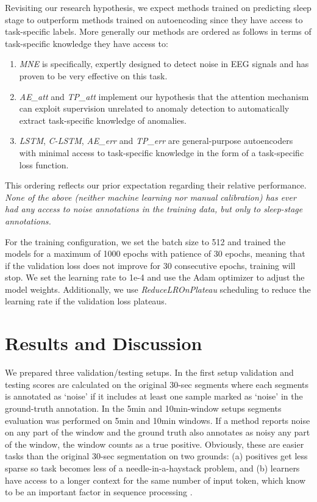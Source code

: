 \documentclass[runningheads]{llncs}
\begin{document}
Revisiting our research hypothesis, we expect methods trained on
predicting sleep stage to outperform methods trained on autoencoding
since they have access to task-specific labels. More generally our
methods are ordered as follows in terms of task-specific knowledge
they have access to:
%
\begin{enumerate}
\item \emph{MNE} is specifically, expertly designed to detect noise in
  EEG signals and has proven to be very effective on this task.
\item \emph{AE\_att} and \emph{TP\_att} implement our hypothesis that
  the attention mechanism can exploit supervision unrelated to anomaly
  detection to automatically extract task-specific knowledge of
  anomalies.
\item \emph{LSTM}, \emph{C-LSTM}, \emph{AE\_err} and \emph{TP\_err}
  are general-purpose autoencoders with minimal access to task-specific
  knowledge in the form of a task-specific loss function.
\end{enumerate}
%
This ordering reflects our prior expectation regarding their relative
performance. \emph{None of the above (neither machine learning nor
manual calibration) has ever had any access to noise annotations
in the training data, but only to sleep-stage annotations.}

For the training configuration, we set the batch size to 512 and
trained the models for a maximum of 1000 epochs with patience of 30
epochs, meaning that if the validation loss does not improve for 30
consecutive epochs, training will stop. We set the learning rate to
1e-4 and use the Adam optimizer to adjust the model
weights. Additionally, we use \emph{ReduceLROnPlateau} scheduling to
reduce the learning rate if the validation loss plateaus.


\section{Results and Discussion}
\label{sec:results}

We prepared three validation/testing setups. In the first setup
validation and testing scores are calculated on the original 30-sec
segments where each segments is annotated as `noise' if it includes at
least one sample marked as `noise' in the ground-truth annotation.
In the 5min and 10min-window setups segments evaluation was performed
on 5min and 10min windows. If a method reports noise on any part of
the window and the ground truth also annotates as noisy any part of the
window, the window counts as a true positive. Obviously, these are
easier tasks than the original 30-sec segmentation on two
grounds: (a) positives get less sparse so task becomes less of a
needle-in-a-haystack problem, and (b) learners have access to a longer
context for the same number of input token, which know to be an
important factor in sequence processing \cite{Lee_2021}.
\end{document}

